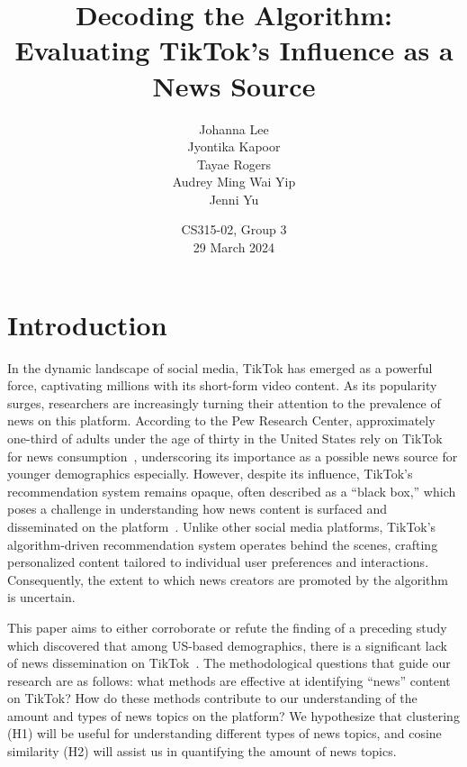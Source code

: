 \documentclass{article}
\title{Decoding the Algorithm: \\
       Evaluating TikTok's Influence as a News Source}
\author{
    Johanna Lee \\
    Jyontika Kapoor \\
    Tayae Rogers \\ 
    Audrey Ming Wai Yip \\
    Jenni Yu \\
    \vspace{2em} %
}
\date{CS315-02, Group 3 \\
29 March 2024
}
\begin{document}
\linespread{1.1}
\begin{titlingpage}
\pagestyle{empty} %
\centering %
\maketitle
\end{titlingpage}
\restoregeometry %
\newpage
\tableofcontents
\newpage


\section{Introduction}
In the dynamic landscape of social media, TikTok has emerged as a powerful 
force, captivating millions with its short-form video content. As its 
popularity surges, researchers are increasingly turning their attention to the 
prevalence of news on this platform. According to the Pew Research Center, 
approximately one-third of adults under the age of thirty in the United States 
rely on TikTok for news consumption~\cite{pewresearch2023}, underscoring its 
importance as a possible news source for younger demographics especially. 
However, despite its influence, TikTok's recommendation system remains opaque, 
often described as a “black box,” which poses a challenge in understanding how 
news content is surfaced and disseminated on the platform~\cite
{boeker2022empirical}. Unlike other social media platforms, TikTok's 
algorithm-driven recommendation system operates behind the scenes, crafting 
personalized content tailored to individual user preferences and interactions. 
Consequently, the extent to which news creators are promoted by the algorithm 
is uncertain. \newline

{\noindent}This paper aims to either corroborate or refute the finding of a preceding study which discovered that among US-based demographics, there is a 
significant lack of news dissemination on TikTok~\cite{hagar2023algorithmic}. 
The methodological questions that guide our research are as follows: what 
methods are effective at identifying “news” content on TikTok? How do these 
methods contribute to our understanding of the amount and types of news topics 
on the platform? We hypothesize that clustering (H1) will be useful for 
understanding different types of news topics, and cosine similarity (H2) will assist us in quantifying the amount of news topics.\newline
\end{document}
